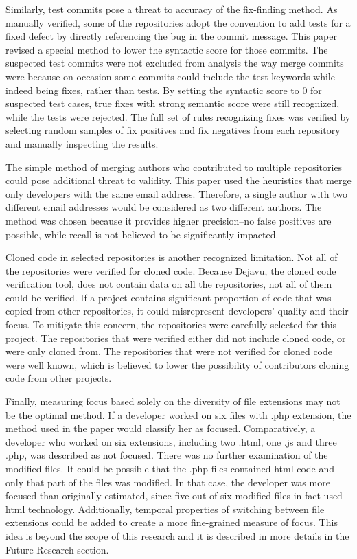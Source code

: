 Similarly, test commits pose a threat to accuracy of the fix-finding method. As manually verified, some of the repositories adopt the convention to add tests for a fixed defect by directly referencing the bug in the commit message. This paper revised a special method to lower the syntactic score for those commits. The suspected test commits were not excluded from analysis the way merge commits were because on occasion some commits could include the test keywords while indeed being fixes, rather than tests. By setting the syntactic score to 0 for suspected test cases, true fixes with strong semantic score were still recognized, while the tests were rejected. The full set of rules recognizing fixes was verified by selecting random samples of fix positives and fix negatives from each repository and manually inspecting the results. \par

The simple method of merging authors who contributed to multiple repositories could pose additional threat to validity. This paper used the heuristics that merge only developers with the same email address. Therefore, a single author with two different email addresses would be considered as two different authors. The method was chosen because it provides higher precision–no false positives are possible, while recall is not believed to be significantly impacted. \par

Cloned code in selected repositories is another recognized limitation. Not all of the repositories were verified for cloned code. Because Dejavu, the cloned code verification tool, does not contain data on all the repositories, not all of them could be verified. If a project contains significant proportion of code that was copied from other repositories, it could misrepresent developers’ quality and their focus. To mitigate this concern, the repositories were carefully selected for this project. The repositories that were verified either did not include cloned code, or were only cloned from. The repositories that were not verified for cloned code were well known, which is believed to lower the possibility of contributors cloning code from other projects.  \par

Finally, measuring focus based solely on the diversity of file extensions may not be the optimal method. If a developer worked on six files with .php extension, the method used in the paper would classify her as focused. Comparatively, a developer who worked on six extensions, including two .html, one .js and three .php, was described as not focused. There was no further examination of the modified files. It could be possible that the .php files contained html code and only that part of the files was modified. In that case, the developer was more focused than originally estimated, since five out of six modified files in fact used html technology. Additionally, temporal properties of switching between file extensions could be added to create a more fine-grained measure of focus. This idea is beyond the scope of this research and it is described in more details in the Future Research section. \par

